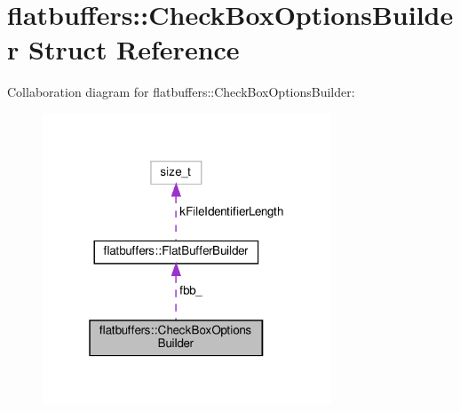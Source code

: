 \hypertarget{structflatbuffers_1_1CheckBoxOptionsBuilder}{}\section{flatbuffers\+:\+:Check\+Box\+Options\+Builder Struct Reference}
\label{structflatbuffers_1_1CheckBoxOptionsBuilder}


Collaboration diagram for flatbuffers\+:\+:Check\+Box\+Options\+Builder\+:
\nopagebreak
\begin{figure}[H]
\begin{center}
\leavevmode
\includegraphics[width=244pt]{structflatbuffers_1_1CheckBoxOptionsBuilder__coll__graph}
\end{center}
\end{figure}
